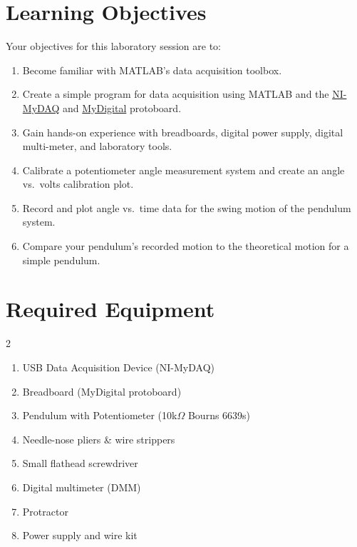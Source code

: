 \documentclass{article}
\begin{document}


\clearpage

\section{Learning Objectives}
Your objectives for this laboratory session are to:
\begin{enumerate}
    \item Become familiar with MATLAB’s data acquisition toolbox.
    \item Create a simple program for data acquisition using MATLAB and the \href{https://www.ni.com/docs/en-US/bundle/mydaq-specs/page/specs.html}{NI-MyDAQ} and \href{https://www.ni.com/en-us/shop/model/digilent-mydigital.html}{MyDigital} protoboard.
    \item Gain hands-on experience with breadboards, digital power supply, digital multi-meter, and laboratory tools.
    \item Calibrate a potentiometer angle measurement system and create an angle vs.\ volts calibration plot.
    \item Record and plot angle vs.\ time data for the swing motion of the pendulum system.
    \item Compare your pendulum’s recorded motion to the theoretical motion for a simple pendulum.
\end{enumerate}

\section{Required Equipment}
\begin{multicols}{2}
\begin{enumerate}
    \item USB Data Acquisition Device (NI-MyDAQ)
    \item Breadboard (MyDigital protoboard)
    \item Pendulum with Potentiometer (10k$\Omega$ Bourns 6639s)
    \item Needle-nose pliers \& wire strippers
    \item Small flathead screwdriver
    \item Digital multimeter (DMM)
    \item Protractor
    \item Power supply and wire kit
\end{enumerate}
\end{multicols}
\end{document}
